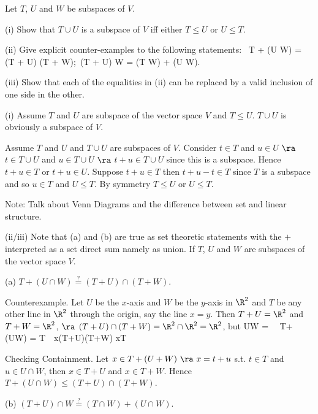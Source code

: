 \begin{problem}
Let $T$, $U$ and $W$ be subspaces of $V$.
\ben
\item [(i)] Show that $T \cup U$ is a subspace of $V$ iff either $T \leq U$ or $U \leq T$.
\item [(ii)] Give explicit counter-examples to the following statements:
\be
{}\ T + (U \cap W) = (T + U) \cap (T + W);\quad\quad {}\ (T + U) \cap W = (T \cap W) + (U \cap W).
\ee
\item [(iii)] Show that each of the equalities in (ii) can be replaced by a valid inclusion of one side in the other.
\een
\end{problem}

\begin{solution}[\bf Solution.]
\ben 
\item [(i)] Assume $T$ and $U$ are subspace of the vector space $V$ and $T\leq U$. $T\cup U$ is obviously a subspace of $V$.

Assume $T$ and $U$ and $T\cup U$ are subspaces of $V$. Consider $t\in T$ and $u\in U$ $\ra$ $t\in T\cup U$ and $u \in T\cup U$ $\ra$ $t+u \in T\cup U$ since this is a subspace. Hence $t+u \in T$ or $t+u \in U$. Suppose $t+u \in T$ then $t+u - t \in T$ since $T$ is a subspace and so $u\in T$ and $U\leq T$. By symmetry $T\leq U$ or $U\leq T$.

Note: Talk about Venn Diagrams and the difference between set and linear structure.

\item [(ii/iii)] Note that (a) and (b) are true as set theoretic statements with the $+$ interpreted as a set direct sum namely as union. If $T$, $U$ and $W$ are subspaces of the vector space $V$.

\ben
\item [(a)] $T+(U\cap W) \stackrel{?}{=} (T+U)\cap (T+W)$.

Counterexample. Let $U$ be the $x$-axis and $W$ be the $y$-axis in $\R^2$ and $T$ be any other line in $\R^2$ through the origin, say the line $x=y$. Then $T+U = \R^2$ and $T+W = \R^2$, $\ra$ $(T+U)\cap (T+W) = \R^2\cap \R^2 = \R^2$, but 
\be
U\cap W = \ \ra\ T+(U\cap W) = T\ \ra \ \exists x\in (T+U)\cap (T+W) x\notin T 
\ee

Checking Containment. Let $x\in T+(U+W)\ \ra\ x= t+u$ s.t. $t\in T$ and $u\in U\cap W$, then $x\in T+U$ and $x\in T+W$. Hence $T+(U\cap W) \leq (T+U)\cap (T+W)$.

\item [(b)] $(T+U)\cap W \stackrel{?}{=} (T\cap W) + (U\cap W)$.


\end{solution}
